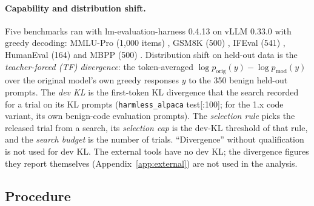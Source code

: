 \paragraph{Capability and distribution shift.} Five benchmarks ran with lm-evaluation-harness 0.4.13
\cite{gao2024language} on vLLM 0.33.0 with greedy decoding: MMLU-Pro (1{,}000 items) \cite{wang2024mmlupro},
GSM8K (500) \cite{cobbe2021training}, IFEval (541) \cite{zhou2023instruction}, HumanEval (164)
\cite{chen2021evaluating} and MBPP (500) \cite{austin2021program}. Distribution shift on held-out data is the
\emph{teacher-forced (TF) divergence}: the token-averaged $\log p_{\mathrm{orig}}(y)-\log p_{\mathrm{mod}}(y)$ over
the original model's own greedy responses $y$ to the 350 benign held-out prompts. The \emph{dev KL} is the
first-token KL divergence that the search recorded for a trial on its KL prompts (\texttt{harmless\_alpaca}
test[:100]; for the 1.x code variant, its own benign-code evaluation prompts). The \emph{selection
rule} picks the released trial from a search, its \emph{selection cap} is the dev-KL threshold of that rule, and
the \emph{search budget} is the number of trials. ``Divergence'' without qualification is not used for dev KL. The
external tools have no dev KL; the divergence figures they report themselves (Appendix~\ref{app:external}) are not
used in the analysis.

\subsection{Procedure}
\label{sec:procedure}

